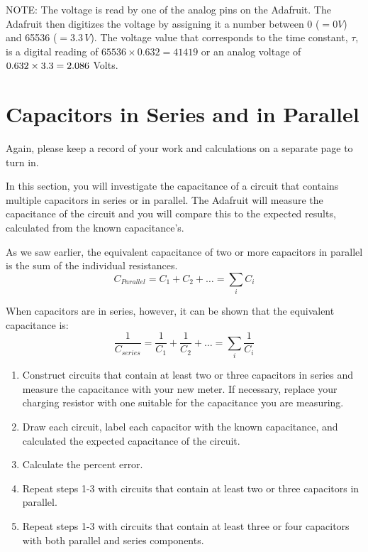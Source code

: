 \documentclass[]{article}
\begin{document}
NOTE: The voltage is read by one of the analog pins on the Adafruit.  The Adafruit then digitizes the voltage by assigning it a number between 0 ($=0V$) and 65536 ($=3.3\,V$).   The voltage value that corresponds to the time constant, $\tau$,  is a digital reading of \(65536 \times 0.632 = 41419\) or an analog voltage of $\displaystyle 0.632 \times 3.3 = 2.086$ Volts.



\section{Capacitors in Series and in Parallel}
Again, please keep a record of your work and  calculations on a separate page to turn in.

In this section, you will investigate the capacitance of a circuit that contains multiple capacitors in series or in parallel.  The Adafruit will measure the capacitance of the circuit and you will compare this to the expected results, calculated from the known capacitance's.

As we saw earlier, the equivalent capacitance of two or more capacitors in parallel is the sum of the individual resistances.
\begin{equation*}
C_{Parallel} = C_1 + C_2 +\dots = \sum_i C_i
\end{equation*}

When capacitors are in series, however, it  can be shown that the equivalent capacitance is:
\begin{equation*}
\frac{1}{C_{series}} = \frac{1}{C_1} + \frac{1}{C_2} + \dots = \sum_i \frac{1}{C_i}
\end{equation*}

\begin{enumerate}
	\item Construct circuits that contain at least two or three capacitors in series and measure the capacitance with your new meter.  If necessary, replace your charging resistor with one suitable for the capacitance you are measuring.
	
	\item Draw each circuit, label each capacitor with the known capacitance, and calculated the expected capacitance of the circuit.
		
	\item Calculate the percent error.
	
	\item Repeat steps 1-3 with circuits that contain at least two or three capacitors in parallel.
	
	\item Repeat steps 1-3 with circuits that contain at least three or four capacitors with both parallel and series components.
	
\end{enumerate}
\end{document}
